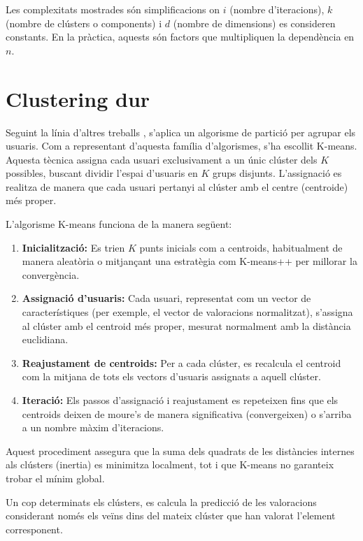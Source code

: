 \documentclass[a4paper,12pt]{report}
\begin{document}
Les complexitats mostrades són simplificacions on $i$ (nombre d'iteracions), $k$ (nombre de clústers o components) i $d$ (nombre de dimensions) es consideren constants. En la pràctica, aquests són factors que multipliquen la dependència en $n$.
 
\section{Clustering dur}

Seguint la línia d'altres treballs \cite{dakhel2011new}, s'aplica un algorisme de partició per agrupar els usuaris. Com a representant d'aquesta família d'algorismes, s'ha escollit K-means. Aquesta tècnica assigna cada usuari exclusivament a un únic clúster dels $K$ possibles, buscant dividir l'espai d'usuaris en $K$ grups disjunts. L'assignació es realitza de manera que cada usuari pertanyi al clúster amb el centre (centroide) més proper.

L’algorisme K-means funciona de la manera següent:

\begin{enumerate}
    \item \textbf{Inicialització:} Es trien $K$ punts inicials com a centroids, habitualment de manera aleatòria o mitjançant una estratègia com K-means++ per millorar la convergència.
    \item \textbf{Assignació d’usuaris:} Cada usuari, representat com un vector de característiques (per exemple, el vector de valoracions normalitzat), s’assigna al clúster amb el centroid més proper, mesurat normalment amb la distància euclidiana.
    \item \textbf{Reajustament de centroids:} Per a cada clúster, es recalcula el centroid com la mitjana de tots els vectors d’usuaris assignats a aquell clúster.
    \item \textbf{Iteració:} Els passos d’assignació i reajustament es repeteixen fins que els centroids deixen de moure’s de manera significativa (convergeixen) o s’arriba a un nombre màxim d’iteracions.
\end{enumerate}

Aquest procediment assegura que la suma dels quadrats de les distàncies internes als clústers (inertia) es minimitza localment, tot i que K-means no garanteix trobar el mínim global.

Un cop determinats els clústers, es calcula la predicció de les valoracions considerant només els veïns dins del mateix clúster que han valorat l’element corresponent.
\end{document}
